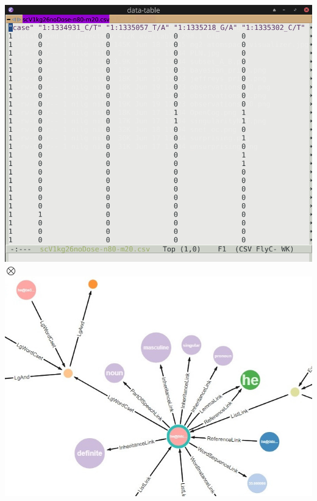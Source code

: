 \documentclass[aspectratio=169]{beamer}
\begin{document}
\begin{frame}
  \begin{columns}
    \column{5cm}
    \includegraphics[scale=0.15]{images/table.png}
    \column{0.3cm}
    $\bigotimes$
    \column{5cm}
    \includegraphics[scale=0.3]{images/atomspace.jpg}
  \end{columns}
\end{frame}
\end{document}
